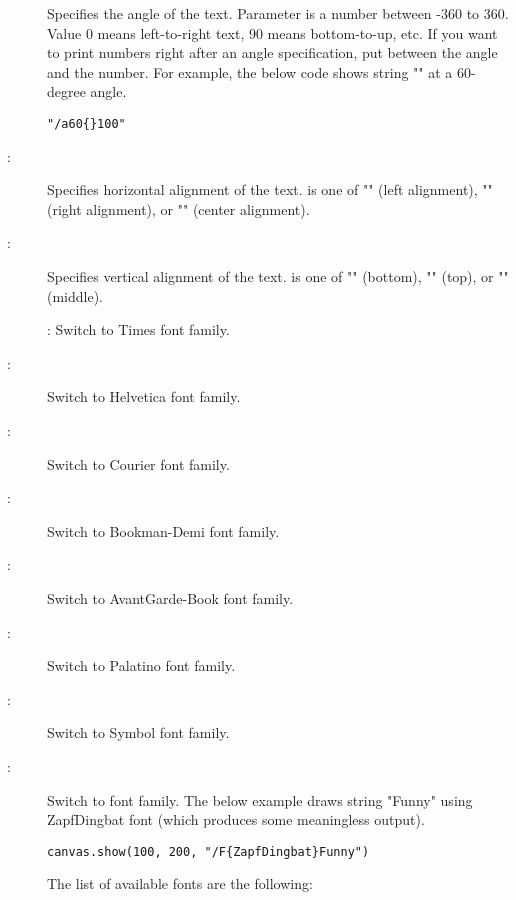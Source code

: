 \documentclass{howto}
\begin{document}
\begin{description}

\item[]
Specifies the angle of the text.  Parameter  is a number
between -360 to 360.  Value 0 means left-to-right text, 90 means
bottom-to-up, etc.
If you want to print numbers right after an angle specification, put
\code{\{} between the angle and the number. For example, the below
code shows string "" at a 60-degree angle.

\begin{verbatim}
"/a60{}100"
\end{verbatim}

\item[:]
Specifies horizontal alignment of the text.   is one of
"" (left alignment), "" (right alignment), or ""
(center alignment).

\item[:]
Specifies vertical alignment of the text.   is one of ""
(bottom), "" (top), or "" (middle).

\item[]:
Switch to Times font family.

\item[:] Switch to Helvetica font family.
\item[:] Switch to Courier font family.
\item[:] Switch to Bookman-Demi font family.
\item[:] Switch to AvantGarde-Book font family.
\item[:] Switch to Palatino font family.
\item[:] Switch to Symbol font family.
\item[:] Switch to  font family.
The below example draws string "Funny" using ZapfDingbat font
(which produces some meaningless output).

\begin{verbatim}
canvas.show(100, 200, "/F{ZapfDingbat}Funny")
\end{verbatim}

The list of available fonts are the following:


\end{description}
\end{document}
